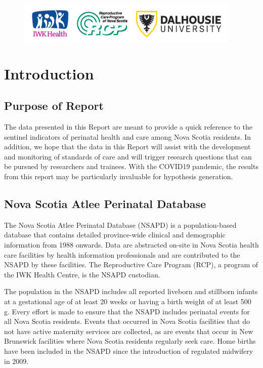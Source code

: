 \documentclass[
]{krantz}
\begin{document}
\begin{figure}[b]
\centering
\includegraphics[width=0.95\textwidth]{images/3_logos_3.png}
\end{figure}

\hypertarget{introduction}{%
\chapter*{Introduction}\label{introduction}}


\hypertarget{purpose-of-report}{%
\section*{Purpose of Report}\label{purpose-of-report}}


The data presented in this Report are meant to provide a quick reference to the sentinel indicators of perinatal health and care among Nova Scotia residents. In addition, we hope that the data in this Report will assist with the development and monitoring of standards of care and will trigger research questions that can be pursued by
researchers and trainees. With the COVID19 pandemic, the results from this report may be particularly invaluable for hypothesis generation.

\hypertarget{nova-scotia-atlee-perinatal-database}{%
\section*{Nova Scotia Atlee Perinatal Database}\label{nova-scotia-atlee-perinatal-database}}


The Nova Scotia Atlee Perinatal Database (NSAPD) is a population-based database that contains detailed
province-wide clinical and demographic information from 1988 onwards. Data are abstracted on-site in Nova Scotia health care facilities by health information professionals and are contributed to the NSAPD by these facilities. The Reproductive Care Program (RCP), a program of the IWK Health Centre, is the NSAPD custodian.

The population in the NSAPD includes all reported liveborn and stillborn infants at a gestational age of at least 20 weeks or having a birth weight of at least 500 g. Every effort is made to ensure that the NSAPD includes perinatal events for all Nova Scotia residents. Events that occurred in Nova Scotia facilities that do not have active maternity services are collected, as are events that occur in New Brunswick facilities where Nova Scotia residents regularly seek care. Home births have been included in the NSAPD since the introduction of regulated
midwifery in 2009.
\end{document}
